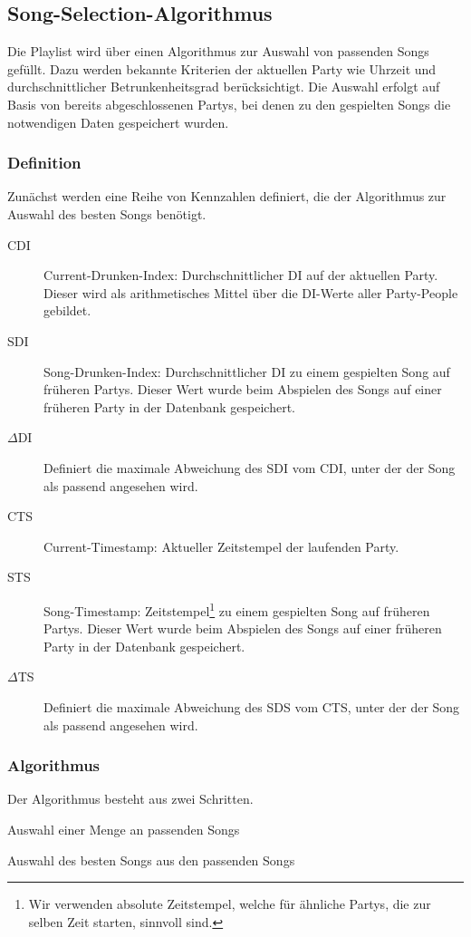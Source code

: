\subsection{Song-Selection-Algorithmus}
\label{sec:SongSelect}
Die Playlist wird über einen Algorithmus zur Auswahl von passenden Songs gefüllt. Dazu werden bekannte Kriterien der aktuellen Party wie Uhrzeit und durchschnittlicher Betrunkenheitsgrad berücksichtigt. Die Auswahl erfolgt auf Basis von bereits abgeschlossenen Partys, bei denen zu den gespielten Songs die notwendigen Daten gespeichert wurden.

\subsubsection{Definition}
Zunächst werden eine Reihe von Kennzahlen definiert, die der Algorithmus zur Auswahl des besten Songs benötigt.

\begin{description}
	\item[CDI] Current-Drunken-Index: Durchschnittlicher DI auf der aktuellen Party. Dieser wird als arithmetisches Mittel über die DI-Werte aller Party-People gebildet.
	\item[SDI] Song-Drunken-Index: Durchschnittlicher DI zu einem gespielten Song auf früheren Partys. Dieser Wert wurde beim Abspielen des Songs auf einer früheren Party in der Datenbank gespeichert.
	\item[$\Delta$DI] Definiert die maximale Abweichung des SDI vom CDI, unter der der Song als passend angesehen wird.
	\item[CTS] Current-Timestamp: Aktueller Zeitstempel der laufenden Party.
	\item[STS] Song-Timestamp: Zeitstempel\footnote{Wir verwenden absolute Zeitstempel, welche für ähnliche Partys, die zur selben Zeit starten, sinnvoll sind.} zu einem gespielten Song auf früheren Partys. Dieser Wert wurde beim Abspielen des Songs auf einer früheren Party in der Datenbank gespeichert.
	\item[$\Delta$TS] Definiert die maximale Abweichung des SDS vom CTS, unter der der Song als passend angesehen wird.
\end{description}

\subsubsection{Algorithmus}
Der Algorithmus besteht aus zwei Schritten.
\begin{compactenum}
	\item Auswahl einer Menge an passenden Songs
	\item Auswahl des besten Songs aus den passenden Songs
\end{compactenum}

